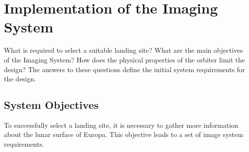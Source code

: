 \section{Implementation of the Imaging System}
What is required to select a suitable landing site? What are the main objectives of the Imaging System? How does the physical properties of the orbiter limit the design? The answers to these questions define the initial system requirements for the design.
\subsection{System Objectives}
To successfully select a landing site, it is necessary to gather more information about the lunar surface of Europa. This objective leads to a set of image system requirements.
